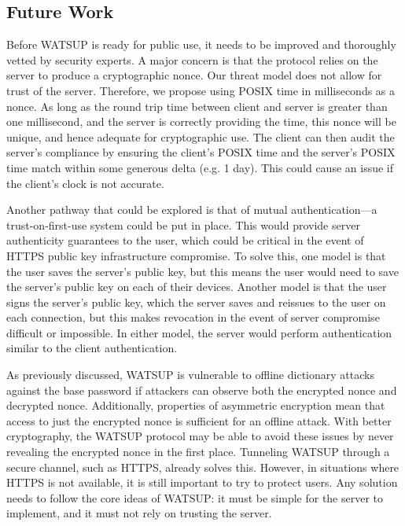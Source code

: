 \subsection{Future Work}

Before WATSUP is ready for public use, it needs to be improved and thoroughly vetted by security experts. A major concern is that the protocol relies on the server to produce a cryptographic nonce. Our threat model does not allow for trust of the server. Therefore, we propose using POSIX time in milliseconds as a nonce. As long as the round trip time between client and server is greater than one millisecond, and the server is correctly providing the time, this nonce will be unique, and hence adequate for cryptographic use. The client can then audit the server's compliance by ensuring the client's POSIX time and the server's POSIX time match within some generous delta (e.g. 1 day). This could cause an issue if the client's clock is not accurate.

Another pathway that could be explored is that of mutual authentication---a trust-on-first-use system could be put in place. This would provide server authenticity guarantees to the user, which could be critical in the event of HTTPS public key infrastructure compromise. To solve this, one model is that the user saves the server's public key, but this means the user would need to save the server's public key on each of their devices. Another model is that the user signs the server's public key, which the server saves and reissues to the user on each connection, but this makes revocation in the event of server compromise difficult or impossible. In either model, the server would perform authentication similar to the client authentication.

As previously discussed, WATSUP is vulnerable to offline dictionary attacks against the base password if attackers can observe both the encrypted nonce and decrypted nonce. Additionally, properties of asymmetric encryption mean that access to just the encrypted nonce is sufficient for an offline attack. With better cryptography, the WATSUP protocol may be able to avoid these issues by never revealing the encrypted nonce in the first place. Tunneling WATSUP through a secure channel, such as HTTPS, already solves this. However, in situations where HTTPS is not available, it is still important to try to protect users. Any solution needs to follow the core ideas of WATSUP: it must be simple for the server to implement, and it must not rely on trusting the server.

